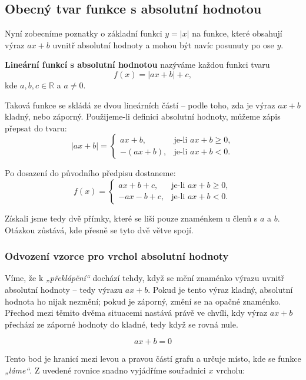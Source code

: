 \documentclass[12pt,a4paper]{article}
\begin{document}
\subsection{Obecný tvar funkce s absolutní hodnotou}

Nyní zobecníme poznatky o základní funkci $y = |x|$ na funkce, které obsahují výraz $a x + b$ uvnitř absolutní hodnoty a mohou být navíc posunuty po ose $y$.

\begin{definitionbox}
\textbf{Lineární funkcí s absolutní hodnotou} nazýváme každou funkci tvaru
\[
f(x) = |a x + b| + c,
\]
kde $a, b, c \in \mathbb{R}$ a $a \ne 0$.
\end{definitionbox}

Taková funkce se skládá ze dvou lineárních částí – podle toho, zda je výraz $a x + b$ kladný, nebo záporný.  
Použijeme-li definici absolutní hodnoty, můžeme zápis přepsat do tvaru:
\[
|a x + b| =
\begin{cases}
a x + b, & \text{je-li } a x + b \ge 0,\\[4pt]
-(a x + b), & \text{je-li } a x + b < 0.
\end{cases}
\]

Po dosazení do původního předpisu dostaneme:
\[
f(x) =
\begin{cases}
a x + b + c, & \text{je-li } a x + b \ge 0,\\[6pt]
- a x - b + c, & \text{je-li } a x + b < 0.
\end{cases}
\]

Získali jsme tedy dvě přímky, které se liší pouze znaménkem u členů s $a$ a $b$.  
Otázkou zůstává, kde přesně se tyto dvě větve spojí.

\subsubsection*{Odvození vzorce pro vrchol absolutní hodnoty}

Víme, že k \textit{„překlápění“} dochází tehdy, když se mění znaménko výrazu uvnitř absolutní hodnoty – tedy výrazu $a x + b$.  
Pokud je tento výraz kladný, absolutní hodnota ho nijak nezmění; pokud je záporný, změní se na opačné znaménko.  
Přechod mezi těmito dvěma situacemi nastává právě ve chvíli, kdy výraz $a x + b$ přechází ze záporné hodnoty do kladné, tedy když se rovná nule.

\[
a x + b = 0
\]

Tento bod je hranicí mezi levou a pravou částí grafu a určuje místo, kde se funkce \textit{„láme“}.  
Z uvedené rovnice snadno vyjádříme souřadnici $x$ vrcholu:
\end{document}

